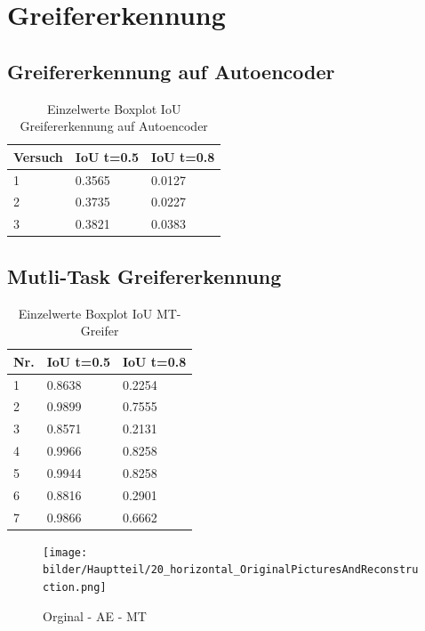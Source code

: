 \chapter{Greifererkennung}
\label{appendix:Greifererkennung}

	\section{Greifererkennung auf Autoencoder}
	\label{appendix:GreifererkennungAufAutoencoder}
	
		\begin{table}[ht]
		\centering
		\begin{tabularx}{\textwidth}{lll}
			\textbf{Versuch}  & \textbf{IoU t=0.5} & \textbf{IoU t=0.8}  	 \\ \hline 
			1 & 0.3565 & 0.0127 \\
			2 & 0.3735 & 0.0227 \\
			3 & 0.3821 & 0.0383 \\ 
		\end{tabularx}
		\caption{Einzelwerte Boxplot IoU Greifererkennung auf Autoencoder}
		\label{table:EinzelwerteBoxplotIoUGreifererkennungaufAutoencoder}
	\end{table}

	\section{Mutli-Task Greifererkennung}
	\label{appendix:MutliTaskGreifererkennung}
	
	\begin{table}[ht]
	\centering
	\begin{tabularx}{\textwidth}{lll}
		 \textbf{Nr.}  & \textbf{IoU t=0.5} & \textbf{IoU t=0.8}  	 \\ \hline 
		1 & 0.8638 & 0.2254 \\
		2 & 0.9899 & 0.7555 \\
		3 & 0.8571  & 0.2131 \\
		4 & 0.9966 & 0.8258 \\
		5 & 0.9944 & 0.8258  \\
		6 & 0.8816 & 0.2901 \\
		7 & 0.9866 & 0.6662 \\	
	\end{tabularx}
	\caption{Einzelwerte Boxplot IoU MT-Greifer}
	\label{table:EinzelwerteBoxplotIoUMTGreifer}
\end{table}



	\begin{figure}[h]
		\centering
		\texttt{[image: bilder/Hauptteil/20\_horizontal\_OriginalPicturesAndReconstruction.png]}
		\caption{Orginal -  AE - MT}
		\label{img:AppendixReconstruction}	
	\end{figure}


